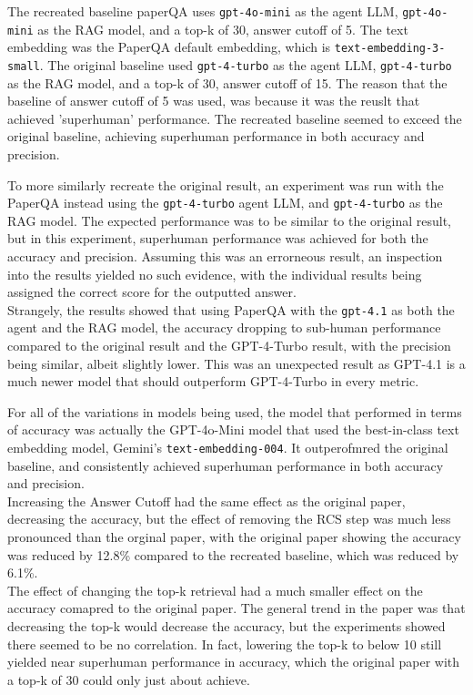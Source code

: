 The recreated baseline paperQA uses \texttt{gpt-4o-mini} as the agent LLM, \texttt{gpt-4o-mini} as the RAG model, and a top-k of 30, answer cutoff of 5. The text embedding was the PaperQA default embedding, which is \texttt{text-embedding-3-small}. The original baseline used \texttt{gpt-4-turbo} as the agent LLM, \texttt{gpt-4-turbo} as the RAG model, and a top-k of 30, answer cutoff of 15. 
The reason that the baseline of answer cutoff of 5 was used, was because it was the reuslt that achieved 'superhuman' performance. The recreated baseline seemed to exceed the original baseline, achieving superhuman performance in both accuracy and precision. 

To more similarly recreate the original result, an experiment was run with the PaperQA instead using the \texttt{gpt-4-turbo} agent LLM, and \texttt{gpt-4-turbo} as the RAG model. The expected performance was to be similar to the original result, but in this experiment, superhuman performance was achieved for both the accuracy and precision. Assuming this was an errorneous result, an inspection into the results yielded no such evidence, with the individual results being assigned the correct score for the outputted answer. \\

Strangely, the results showed that using PaperQA with the \texttt{gpt-4.1} as both the agent and the RAG model, the accuracy dropping to sub-human performance compared to the original result and the GPT-4-Turbo result, with the precision being similar, albeit slightly lower. This was an unexpected result as GPT-4.1 is a much newer model that should outperform GPT-4-Turbo in every metric. 

For all of the variations in models being used, the model that performed in terms of accuracy was actually the GPT-4o-Mini model that used the best-in-class text embedding model, Gemini's \texttt{text-embedding-004}. It outperofmred the original baseline, and consistently achieved superhuman performance in both accuracy and precision. \\

Increasing the Answer Cutoff had the same effect as the original paper, decreasing the accuracy, but the effect of removing the RCS step was much less pronounced than the orginal paper, with the original paper showing the accuracy was reduced by 12.8\% compared to the recreated baseline, which was reduced by 6.1\%.\\

The effect of changing the top-k retrieval had a much smaller effect on the accuracy comapred to the original paper. The general trend in the paper was that decreasing the top-k would decrease the accuracy, but the experiments showed there seemed to be no correlation. In fact, lowering the top-k to below 10 still yielded near superhuman performance in accuracy, which the original paper with a top-k of 30 could only just about achieve. 

